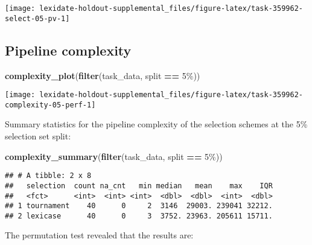 \documentclass[
]{book}
\newenvironment{Shaded}{\begin{snugshade}}{\end{snugshade}}
\newcommand{\FunctionTok}[1]{\textcolor[rgb]{0.13,0.29,0.53}{\textbf{#1}}}
\newcommand{\NormalTok}[1]{#1}
\newcommand{\SpecialCharTok}[1]{\textcolor[rgb]{0.81,0.36,0.00}{\textbf{#1}}}
\newcommand{\StringTok}[1]{\textcolor[rgb]{0.31,0.60,0.02}{#1}}
\begin{document}
\texttt{[image: lexidate-holdout-supplemental\_files/figure-latex/task-359962-select-05-pv-1]}

\hypertarget{pipeline-complexity-48}{%
\subsection{Pipeline complexity}\label{pipeline-complexity-48}}

\begin{Shaded}
\begin{Highlighting}[]
\FunctionTok{complexity\_plot}\NormalTok{(}\FunctionTok{filter}\NormalTok{(task\_data, split }\SpecialCharTok{==} \StringTok{\textquotesingle{}5\%\textquotesingle{}}\NormalTok{))}
\end{Highlighting}
\end{Shaded}

\texttt{[image: lexidate-holdout-supplemental\_files/figure-latex/task-359962-complexity-05-perf-1]}

Summary statistics for the pipeline complexity of the selection schemes at the 5\% selection set split:

\begin{Shaded}
\begin{Highlighting}[]
\FunctionTok{complexity\_summary}\NormalTok{(}\FunctionTok{filter}\NormalTok{(task\_data, split }\SpecialCharTok{==} \StringTok{\textquotesingle{}5\%\textquotesingle{}}\NormalTok{))}
\end{Highlighting}
\end{Shaded}

\begin{verbatim}
## # A tibble: 2 x 8
##   selection  count na_cnt   min median   mean    max    IQR
##   <fct>      <int>  <int> <int>  <dbl>  <dbl>  <int>  <dbl>
## 1 tournament    40      0     2  3146  29003. 239041 32212.
## 2 lexicase      40      0     3  3752. 23963. 205611 15711.
\end{verbatim}

The permutation test revealed that the results are:
\end{document}
